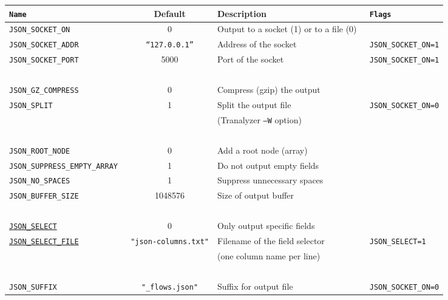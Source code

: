 \documentclass[documentation]{subfiles}
\begin{document}
\begin{longtable}{>{\tt}lcl>{\tt\small}l}
    \toprule
    {\bf Name} & {\bf Default} & {\bf Description} & {\bf Flags}\\
    \midrule\endhead%
    JSON\_SOCKET\_ON             & 0                              & Output to a socket (1) or to a file (0) & \\
    JSON\_SOCKET\_ADDR           & {\tt\small ``127.0.0.1''}      & Address of the socket                   & JSON\_SOCKET\_ON=1\\
    JSON\_SOCKET\_PORT           & 5000                           & Port of the socket                      & JSON\_SOCKET\_ON=1\\
                                 &                                &                                         & \\
    JSON\_GZ\_COMPRESS           & 0                              & Compress (gzip) the output              & \\
    JSON\_SPLIT                  & 1                              & Split the output file                   & JSON\_SOCKET\_ON=0\\
                                 &                                & (Tranalyzer {\tt --W} option)           & \\
                                 &                                &                                         & \\
    JSON\_ROOT\_NODE             & 0                              & Add a root node (array)                 & \\
    JSON\_SUPPRESS\_EMPTY\_ARRAY & 1                              & Do not output empty fields              & \\
    JSON\_NO\_SPACES             & 1                              & Suppress unnecessary spaces             & \\
    JSON\_BUFFER\_SIZE           & 1048576                        & Size of output buffer                   & \\
                                 &                                &                                         & \\
    \hyperref[json:select]{JSON\_SELECT}
                                 & 0                              & Only output specific fields             & \\
    \hyperref[json:select]{JSON\_SELECT\_FILE}
                                 & {\small\tt "json-columns.txt"} & Filename of the field selector          & JSON\_SELECT=1\\
                                 &                                & (one column name per line)\\
                                 &                                &                                         & \\
    JSON\_SUFFIX                 & {\tt\small "\_flows.json"}     & Suffix for output file                  & JSON\_SOCKET\_ON=0\\
    \bottomrule
\end{longtable}
\end{document}
